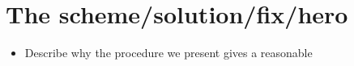\section{The scheme/solution/fix/hero}

\begin{itemize}
    \item Describe why the procedure we present gives a reasonable
\end{itemize}
